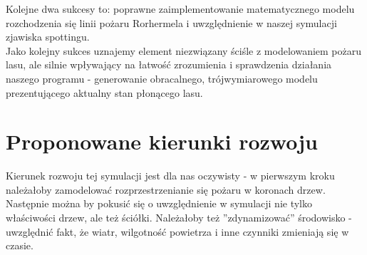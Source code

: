 \documentclass[a4paper, 11pt]{article}
\begin{document}
	Kolejne dwa sukcesy to: poprawne zaimplementowanie  matematycznego modelu rozchodzenia się linii pożaru Rorhermela i uwzględnienie w naszej symulacji zjawiska spottingu.\\
	
	Jako kolejny sukces uznajemy element niezwiązany ściśle z modelowaniem pożaru lasu, ale silnie wpływający na łatwość zrozumienia i sprawdzenia działania naszego programu - generowanie obracalnego, trójwymiarowego modelu prezentującego aktualny stan płonącego lasu.
	
	
	\section*{Proponowane kierunki rozwoju}
	\indent
	
	Kierunek rozwoju tej symulacji jest dla nas oczywisty - w pierwszym kroku należałoby zamodelować rozprzestrzenianie się pożaru w koronach drzew. Następnie można by pokusić się o uwzględnienie w symulacji nie tylko właściwości drzew, ale też ściółki. Należałoby też ''zdynamizować'' środowisko - uwzględnić fakt, że wiatr, wilgotność powietrza i inne czynniki zmieniają się w czasie.
\end{document}
